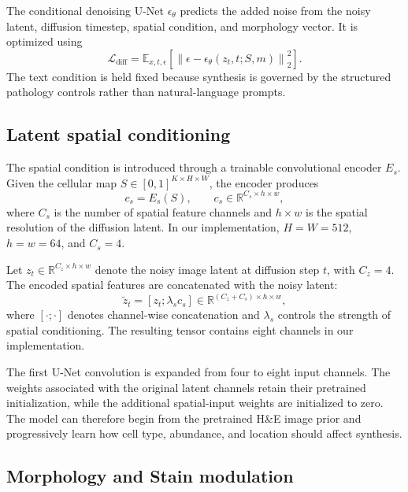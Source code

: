 The conditional denoising U-Net $\epsilon_\theta$ predicts the added noise from the noisy latent, diffusion timestep, spatial condition, and morphology vector. It is optimized using
\begin{equation}
\mathcal{L}_{\mathrm{diff}}
=
\mathbb{E}_{x,t,\epsilon}
\left[
    \left\|
        \epsilon-
        \epsilon_\theta(z_t,t;S,m)
    \right\|_2^2
\right].
\label{eq:diffusion-loss}
\end{equation}
The text condition is held fixed because synthesis is governed by the structured pathology controls rather than natural-language prompts.

\subsection{Latent spatial conditioning}
\label{sec:spatial-conditioning}

The spatial condition is introduced through a trainable convolutional encoder
$E_s$. Given the cellular map
$S\in[0,1]^{K\times H\times W}$, the encoder produces
\begin{equation}
c_s=E_s(S),
\qquad
c_s\in\mathbb{R}^{C_s\times h\times w},
\label{eq:spatial-encoder}
\end{equation}
where $C_s$ is the number of spatial feature channels and $h\times w$ is the spatial resolution of the diffusion latent. In our implementation,
$H=W=512$, $h=w=64$, and $C_s=4$.

Let
$z_t\in\mathbb{R}^{C_z\times h\times w}$ denote the noisy image latent at diffusion step $t$, with $C_z=4$. The encoded spatial features are concatenated with the noisy latent:
\begin{equation}
\widetilde{z}_t
=
\left[
    z_t;\lambda_s c_s
\right]
\in
\mathbb{R}^{(C_z+C_s)\times h\times w},
\label{eq:latent-concatenation}
\end{equation}
where $[\cdot;\cdot]$ denotes channel-wise concatenation and $\lambda_s$ controls the strength of spatial conditioning. The resulting tensor contains eight channels in our implementation.

The first U-Net convolution is expanded from four to eight input channels. The weights associated with the original latent channels retain their pretrained initialization, while the additional spatial-input weights are initialized to zero. The model can therefore begin from the pretrained H\&E image prior and progressively learn how cell type, abundance, and location should affect synthesis.

\subsection{Morphology and Stain modulation}
\label{sec:film-conditioning}

